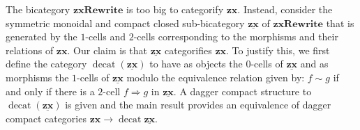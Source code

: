 \documentclass[submission,copyright,creativecommons]{eptcs}
\newcommand{\cat}[1]{\mathbf{#1}}
\newcommand{\bicat}[1]{\underline{\mathbf{#1}}}
\DeclareMathOperator{\decat}{decat}
\begin{document}
The bicategory $\cat{zxRewrite}$ is too big to categorify $\cat{zx}$.  Instead, consider the symmetric monoidal and compact closed sub-bicategory $\bicat{zx}$ of $\cat{zxRewrite}$ that is generated by the $1$-cells and $2$-cells corresponding to the morphisms and their relations of $\cat{zx}$.  Our claim is that $\bicat{zx}$ categorifies $\cat{zx}$.  To justify this, we first define the category $\decat (\bicat{zx})$ to have as objects the $0$-cells of $\bicat{zx}$ and as morphisms the $1$-cells of $\bicat{zx}$ modulo the equivalence relation given by: $f \sim g$ if and only if there is a $2$-cell $f \Rightarrow g$ in $\bicat{zx}$.  A dagger compact structure to $\decat (\bicat{zx})$ is given \cite[Thm.~5.3]{CicalaCatZxCalc} and the main result \cite[Thm.~5,4]{CicalaCatZxCalc} provides an equivalence of dagger compact categories $\cat{zx} \to \decat \bicat{zx}$.


%

\end{document}
